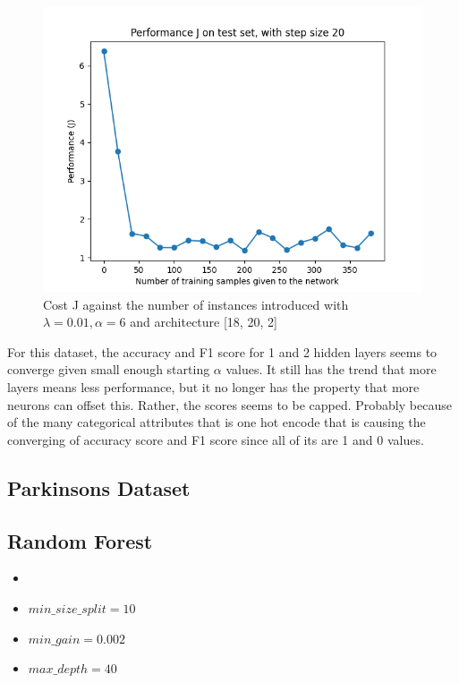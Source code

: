 \documentclass[letterpaper]{article}
\begin{document}
\begin{figure}[H]
	\includegraphics[width=\textwidth]{figures/nn_loan.csv_cost.png}
	\caption{Cost J against the number of instances introduced with $\lambda=0.01, \alpha=6$ and architecture [18, 20, 2]}
	\label{fig:nn-loan}
\end{figure}

For this dataset, the accuracy and F1 score for 1 and 2 hidden layers seems to converge given small enough starting $\alpha$ values. It still has the
trend that more layers means less performance, but it no longer has the property that more neurons can offset this. Rather, the scores seems to be
capped. Probably because of the many categorical attributes that is one hot encode that is causing the converging of accuracy score and F1 score
since all of its are 1 and 0 values.

\subsection{Parkinsons Dataset}

\subsection*{Random Forest}
\begin{itemize}
	\item {}
	\item $min\_size\_split = 10$
	\item $min\_gain = 0.002$
	\item $max\_depth = 40$
\end{itemize}
\end{document}
